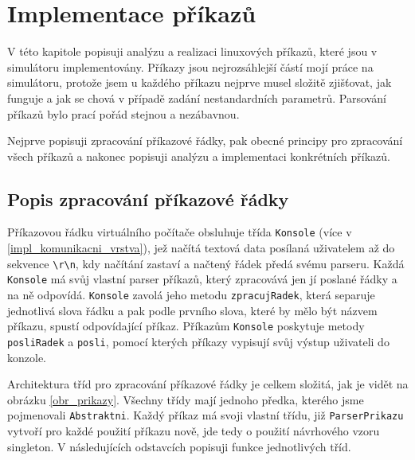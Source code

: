 \chapter{Implementace příkazů}

V této kapitole popisuji analýzu a realizaci linuxových příkazů, které jsou v simulátoru implementovány. Příkazy jsou nejrozsáhlejší částí mojí práce na simulátoru, protože jsem u každého příkazu nejprve musel složitě zjišťovat, jak funguje a jak se chová v případě zadání nestandardních parametrů. Parsování příkazů bylo prací pořád stejnou a nezábavnou. 

Nejprve popisuji zpracování příkazové řádky, pak obecné principy pro zpracování všech příkazů a nakonec popisuji analýzu a implementaci konkrétních příkazů.




\section{Popis zpracování příkazové řádky}

Příkazovou řádku virtuálního počítače obsluhuje třída \verb|Konsole| (více v \ref{impl_komunikacni_vrstva}), jež načítá textová data posílaná uživatelem až do sekvence \verb|\r\n|, kdy načítání zastaví a načtený řádek předá svému parseru. Každá \verb|Konsole| má svůj vlastní parser příkazů, který zpracovává jen jí poslané řádky a na ně odpovídá. \verb|Konsole| zavolá jeho metodu \verb|zpracujRadek|, která separuje jednotlivá slova řádku a pak podle prvního slova, které by mělo být názvem příkazu, spustí odpovídající příkaz. Příkazům \verb|Konsole| poskytuje metody \verb|posliRadek| a \verb|posli|, pomocí kterých příkazy vypisují svůj výstup uživateli do konzole.

Architektura tříd pro zpracování příkazové řádky je celkem složitá, jak je vidět na obrázku \ref{obr_prikazy}. Všechny třídy mají jednoho předka, kterého jsme pojmenovali \verb|Abstraktni|. Každý příkaz má svoji vlastní třídu, již \verb|ParserPrikazu| vytvoří pro každé použití příkazu nově, jde tedy o použití návrhového vzoru singleton. V následujících odstavcích popisuji funkce jednotlivých tříd.

